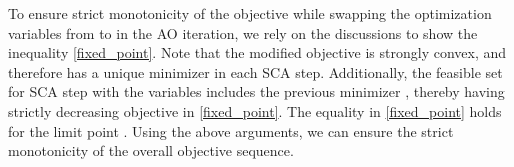 To ensure strict monotonicity of the objective while swapping the optimization variables from \eqn{\mx,\mz} to \eqn{\my,\mz} in the  \ac{AO} iteration, we rely on the discussions to show the inequality \eqref{fixed_point}. Note that the modified objective  is strongly convex, and therefore has a unique minimizer in each \ac{SCA} step. Additionally, the feasible set  for  \ac{SCA} step with the variables \eqn{\my,\mz} includes the previous minimizer , thereby having strictly decreasing objective in \eqref{fixed_point}. The equality in \eqref{fixed_point} holds for the limit point . Using the above arguments, we can ensure the strict monotonicity of the overall objective sequence.


